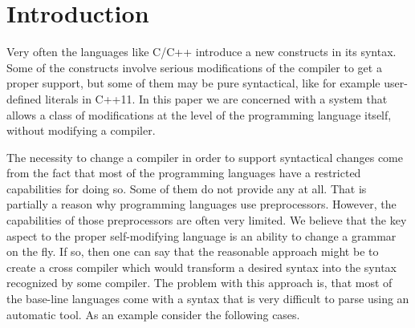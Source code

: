 \section{\label{sec:intro}Introduction}

Very often the languages like C/C++ introduce a new constructs in its
syntax.  Some of the constructs involve serious modifications of the
compiler to get a proper support, but some of them may be pure syntactical,
like for example user-defined literals in C++11.  In this paper we are
concerned with a system that allows a class of modifications at the 
level of the programming language itself, without modifying a compiler.

The necessity to change a compiler in order to support syntactical 
changes come from the fact that most of the programming languages 
have a restricted capabilities for doing so.  Some of them do not
provide any at all.  That is partially a reason why programming 
languages use preprocessors.  However, the capabilities of those
preprocessors are often very limited.  We believe that the key
aspect to the proper self-modifying language is an ability to 
change a grammar on the fly.  If so, then one can say that the
reasonable approach might be to create a cross compiler which
would transform a desired syntax into the syntax recognized by
some compiler.  The problem with this approach is, that most of
the base-line languages come with a syntax that is very difficult
to parse using an automatic tool.  As an example consider the 
following cases.



